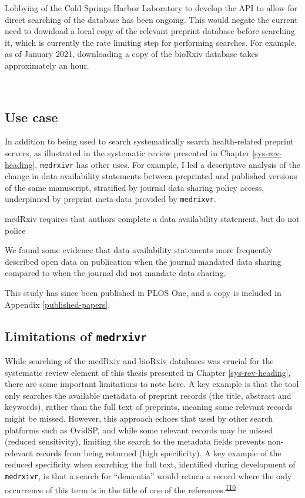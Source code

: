 \documentclass[a4paper, twoside]{templates/ociamthesis}
\begin{document}
Lobbying of the Cold Springs Harbor Laboratory to develop the API to allow for direct searching of the database has been ongoing. This would negate the current need to download a local copy of the relevant preprint database before searching it, which is currently the rate limiting step for performing searches. For example, as of January 2021, downloading a copy of the bioRxiv database takes approximately an hour.

~

\hypertarget{use-case}{%
\subsection{Use case}\label{use-case}}

In addition to being used to search systematically search health-related preprint servers, as illustrated in the systematic review presented in Chapter \ref{sys-rev-heading}, \texttt{medrxivr} has other uses. For example, I led a descriptive analysis of the change in data availability statements between preprinted and published versions of the same manuscript, stratified by journal data sharing policy access, underpinned by preprint meta-data provided by \texttt{medrixvr}.

medRxiv requires that authors complete a data availability statement, but do not police

We found some evidence that data availability statements more frequently described open data on publication when the journal mandated data sharing compared to when the journal did not mandate data sharing.

This study has since been published in PLOS One, and a copy is included in Appendix \ref{published-papers}.

\hypertarget{limitations-of-medrxivr}{%
\subsection{\texorpdfstring{Limitations of \texttt{medrxivr}}{Limitations of medrxivr}}\label{limitations-of-medrxivr}}

While searching of the medRxiv and bioRxiv databases was crucial for the systematic review element of this thesis presented in Chapter \ref{sys-rev-heading}, there are some important limitations to note here. A key example is that the tool only searches the available metadata of preprint records (the title, abstract and keywords), rather than the full text of preprints, meaning some relevant records might be missed. However, this approach echoes that used by other search platforms such as OvidSP, and while some relevant records may be missed (reduced sensitivity), limiting the search to the metadata fields prevents non-relevant records from being returned (high specificity). A key example of the reduced specificity when searching the full text, identified during development of \texttt{medrxivr}, is that a search for ``dementia'' would return a record where the only occurrence of this term is in the title of one of the references.\textsuperscript{\protect\hyperlink{ref-bong2019}{110}}
\end{document}
